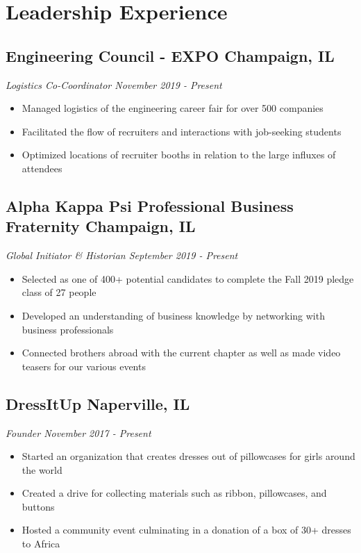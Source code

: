 \documentclass[10pt]{article}
\newcommand{\positiontitle}[1]
        {
            \hspace{-1.8em}
            \textit{#1}
        }
\newcommand{\makepositionheader}[2]
    {
        \subsection{#1 \hfill {\normalsize #2}}
    }
\newcommand{\makepositiondesc}[2]
    {
        \positiontitle{#1 \hfill {\normalsize #2}}    
    }
\newcommand{\contentitem}
    {
        \item\small
    }
\begin{document}
                                                \section{Leadership Experience}
                                    \makepositionheader{Engineering Council - EXPO}{Champaign, IL}
                                    \makepositiondesc{Logistics Co-Coordinator}{November 2019 - Present}
                    \begin{itemize}
                                                    \contentitem Managed logistics of the engineering career fair for over 500 companies
                                                    \contentitem Facilitated the flow of recruiters and interactions with job-seeking students
                                                    \contentitem Optimized locations of recruiter booths in relation to the large influxes of attendees
                                            \end{itemize}
                                            \makepositionheader{Alpha Kappa Psi Professional Business Fraternity}{Champaign, IL}
                                    \makepositiondesc{Global Initiator \& Historian}{September 2019 - Present}
                    \begin{itemize}
                                                    \contentitem Selected as one of 400+ potential candidates to complete the Fall 2019 pledge class of 27 people
                                                    \contentitem Developed an understanding of business knowledge by networking with business professionals
                                                    \contentitem Connected brothers abroad with the current chapter as well as made video teasers for our various events
                                            \end{itemize}
                                            \makepositionheader{DressItUp}{Naperville, IL}
                                    \makepositiondesc{Founder}{November 2017 - Present}
                    \begin{itemize}
                                                    \contentitem Started an organization that creates dresses out of pillowcases for girls around the world
                                                    \contentitem Created a drive for collecting materials such as ribbon, pillowcases, and buttons
                                                    \contentitem Hosted a community event culminating in a donation of a box of 30+ dresses to Africa
                                            \end{itemize}
\end{document}
